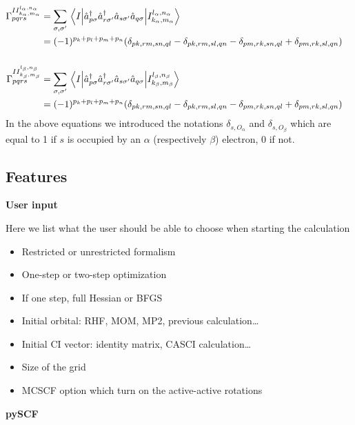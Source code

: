 \documentclass[11pt,a4paper]{article}
\newcommand{\kron}[1]{\delta_{#1}}
\newcommand{\oa}{O_{\alpha}}
\newcommand{\ob}{O_{\beta}}
\begin{document}
\begin{subequations}
\begin{align}
    \notag \\
    \Gamma_{pqrs}^{II_{k_\alpha,m_\alpha}^{l_\alpha,n_\alpha}} &= \sum_{\sigma,\sigma'}\mel{I}{\hat{a}_{p\sigma}^\dagger\hat{a}_{r\sigma'}^\dagger\hat{a}_{s\sigma'}\hat{a}_{q\sigma}}{I_{k_\alpha,m_\alpha}^{l_\alpha,n_\alpha}} \\
                       &= (-1)^{p_k+p_l+p_m+p_n}\mleft(\kron{pk,rm,sn,ql} - \kron{pk,rm,sl,qn} - \kron{pm,rk,sn,ql} + \kron{pm,rk,sl,qn}\mright) \notag\\
    \notag \\
    \Gamma_{pqrs}^{II_{k_\beta,m_\beta}^{l_\beta,n_\beta}} &= \sum_{\sigma,\sigma'}\mel{I}{\hat{a}_{p\sigma}^\dagger\hat{a}_{r\sigma'}^\dagger\hat{a}_{s\sigma'}\hat{a}_{q\sigma}}{I_{k_\beta,m_\beta}^{l_\beta,n_\beta}} \\
    &= (-1)^{p_k+p_l+p_m+p_n}\mleft(\kron{pk,rm,sn,ql} - \kron{pk,rm,sl,qn} - \kron{pm,rk,sn,ql} + \kron{pm,rk,sl,qn}\mright) \notag
  \end{align}
\end{subequations}
In the above equations we introduced the notations $\kron{s,\oa}$ and $\kron{s,\ob}$ which are equal to 1 if $s$ is occupied by an $\alpha$ (respectively $\beta$) electron, 0 if not.

\subsection{Features}

\noindent\textbf{User input}

Here we list what the user should be able to choose when starting the calculation
\begin{itemize}
\item Restricted or unrestricted formalism
\item One-step or two-step optimization
\item If one step, full Hessian or BFGS
\item Initial orbital: RHF, MOM, MP2, previous calculation\dots
\item Initial CI vector: identity matrix, CASCI calculation\dots
\item Size of the grid
\item MCSCF option which turn on the active-active rotations
\end{itemize}

\noindent\textbf{pySCF}
\end{document}
